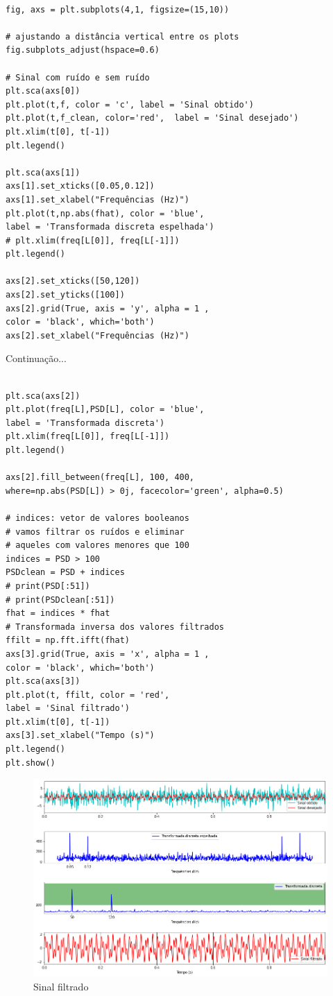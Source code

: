 \begin{verbatim}

fig, axs = plt.subplots(4,1, figsize=(15,10))

# ajustando a distância vertical entre os plots
fig.subplots_adjust(hspace=0.6)

# Sinal com ruído e sem ruído
plt.sca(axs[0])
plt.plot(t,f, color = 'c', label = 'Sinal obtido')
plt.plot(t,f_clean, color='red',  label = 'Sinal desejado')
plt.xlim(t[0], t[-1])
plt.legend()

plt.sca(axs[1])
axs[1].set_xticks([0.05,0.12])
axs[1].set_xlabel("Frequências (Hz)")
plt.plot(t,np.abs(fhat), color = 'blue', 
label = 'Transformada discreta espelhada') 
# plt.xlim(freq[L[0]], freq[L[-1]])
plt.legend()

axs[2].set_xticks([50,120])
axs[2].set_yticks([100])
axs[2].grid(True, axis = 'y', alpha = 1 , 
color = 'black', which='both')
axs[2].set_xlabel("Frequências (Hz)")

\end{verbatim}

Continuação...
\begin{verbatim}

plt.sca(axs[2])
plt.plot(freq[L],PSD[L], color = 'blue', 
label = 'Transformada discreta') 
plt.xlim(freq[L[0]], freq[L[-1]])
plt.legend()

axs[2].fill_between(freq[L], 100, 400, 
where=np.abs(PSD[L]) > 0j, facecolor='green', alpha=0.5)

# indices: vetor de valores booleanos
# vamos filtrar os ruídos e eliminar 
# aqueles com valores menores que 100
indices = PSD > 100
PSDclean = PSD + indices
# print(PSD[:51])
# print(PSDclean[:51])
fhat = indices * fhat
# Transformada inversa dos valores filtrados 
ffilt = np.fft.ifft(fhat)
axs[3].grid(True, axis = 'x', alpha = 1 , 
color = 'black', which='both')
plt.sca(axs[3])
plt.plot(t, ffilt, color = 'red', 
label = 'Sinal filtrado')
plt.xlim(t[0], t[-1])
axs[3].set_xlabel("Tempo (s)")
plt.legend()
plt.show()
\end{verbatim}

\begin{figure}[H]
	\centering
	\includegraphics[width=1\textwidth]{./Imagens/Transformada de Fourier/TF4.png} 
	\caption{Sinal filtrado}
	\label{fig:TF4}
\end{figure}

